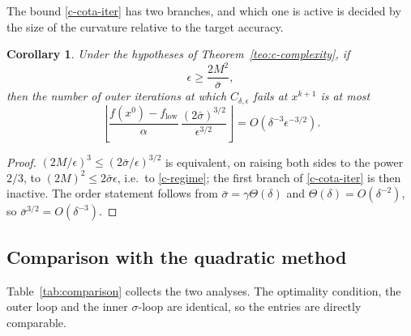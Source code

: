 \documentclass[11pt]{article}
\newcommand{\flow}{f_{\mathrm{low}}}
\newtheorem{corollary}[theorem]{Corollary}
\begin{document}
The bound \eqref{c-cota-iter} has two branches, and which one is active is
decided by the size of the curvature relative to the target accuracy.

\begin{corollary} \label{cor:c-regime}
Under the hypotheses of Theorem~\ref{teo:c-complexity}, if
\begin{equation} \label{c-regime}
\epsilon \geq \frac{2M^2}{\bar{\sigma}},
\end{equation}
then the number of outer iterations at which $C_{\delta,\epsilon}$ fails at
$x^{k+1}$ is at most
\begin{equation} \label{c-cota-clean}
\left\lfloor \frac{f(x^0)-\flow}{\alpha}\,
\frac{(2\bar{\sigma})^{3/2}}{\epsilon^{3/2}} \right\rfloor
= O\!\left( \delta^{-3}\epsilon^{-3/2} \right).
\end{equation}
\end{corollary}

\begin{proof}
$(2M/\epsilon)^3 \leq (2\bar\sigma/\epsilon)^{3/2}$ is equivalent, on raising
both sides to the power $2/3$, to $(2M)^2 \leq 2\bar\sigma\epsilon$, i.e.\ to
\eqref{c-regime}; the first branch of \eqref{c-cota-iter} is then inactive. The
order statement follows from $\bar\sigma = \gamma\Theta(\delta)$ and
$\Theta(\delta) = O(\delta^{-2})$, so $\bar\sigma^{3/2} = O(\delta^{-3})$.
\end{proof}

\subsection*{Comparison with the quadratic method}

Table~\ref{tab:comparison} collects the two analyses. The optimality condition,
the outer loop and the inner $\sigma$-loop are identical, so the entries are
directly comparable.
\end{document}
